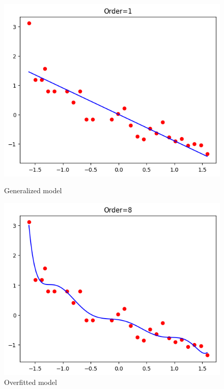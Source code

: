 \documentclass[12pt]{article}
\begin{document}
\begin{figure}[h]
\centering

\begin{minipage}[b]{0.4\linewidth}
  \centering
  \includegraphics[width=\linewidth]{images/lecture_03/img_1.png}
  \caption{Generalized model}
  \label{fig:img_1}
\end{minipage}
\hspace{0.03\linewidth}
\begin{minipage}[b]{0.4\linewidth}
  \centering
  \includegraphics[width=\linewidth]{images/lecture_03/img_2.png}
  \caption{Overfitted model}
  \label{fig:img_2}
\end{minipage}

\end{figure}
\end{document}
